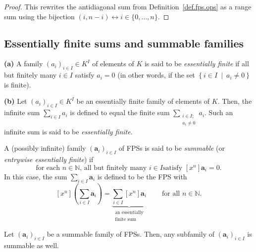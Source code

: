 \begin{proof}
This rewrites the antidiagonal sum from Definition~\ref{def.fps.ops}
as a range sum using the bijection $(i, n-i) \leftrightarrow i \in \{0, \ldots, n\}$.
\end{proof}

\subsection{Essentially finite sums and summable families}

\begin{definition}
\label{def.infsum.essfin}
\leantarget
\leanok
\textbf{(a)} A family $\left(a_{i}\right)_{i\in I}\in K^{I}$
of elements of $K$ is said to be \emph{essentially finite} if all
but finitely many $i\in I$ satisfy $a_{i}=0$ (in other words, if the set
$\left\{i\in I\ \mid\ a_{i}\neq0\right\}$ is finite). \medskip

\textbf{(b)} Let $\left(a_{i}\right)_{i\in I}\in K^{I}$ be an essentially
finite family of elements of $K$. Then, the infinite sum $\sum_{i\in I}a_{i}$
is defined to equal the finite sum $\sum_{\substack{i\in I;\\a_{i}\neq0}}a_{i}$.
Such an infinite sum is said to be \emph{essentially finite}.
\end{definition}

\begin{definition}
\label{def.fps.summable}
\leantarget
\leanok
A (possibly infinite) family $\left(\mathbf{a}_{i}\right)_{i\in I}$
of FPSs is said to be \emph{summable} (or \emph{entrywise essentially finite})
if
\[
\text{for each }n\in\mathbb{N}\text{, all but finitely many }i\in I\text{
satisfy }\left[x^{n}\right]\mathbf{a}_{i}=0.
\]
In this case, the sum $\sum_{i\in I}\mathbf{a}_{i}$ is defined to be the FPS
with
\[
\left[x^{n}\right]\left(\sum_{i\in I}\mathbf{a}_{i}\right)
=\underbrace{\sum_{i\in I}\left[x^{n}\right]\mathbf{a}_{i}}%
_{\substack{\text{an essentially}\\\text{finite sum}}}
\ \ \ \ \ \ \ \ \ \ \text{for all }n\in\mathbb{N}\text{.}
\]
\end{definition}

\begin{proposition}
\label{prop.fps.summable.sub}
\leantarget
\leanok
Let $\left(\mathbf{a}_{i}\right)_{i\in I}$ be
a summable family of FPSs. Then, any subfamily of $\left(\mathbf{a}%
_{i}\right)_{i\in I}$ is summable as well.
\end{proposition}

